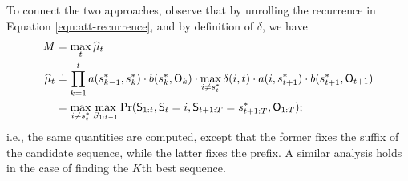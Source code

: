 To connect the two approaches, observe that by unrolling the recurrence in Equation \ref{eqn:att-recurrence}, and by definition of $\delta$, we have
\begin{align*}
	M &= \max_t \widehat{\mu}_t \\
	\widehat{\mu}_{t} &\stackrel{.}{=} \prod_{k = 1}^t a( s^*_{k-1}, s^*_{k} ) \cdot b( s^*_{k}, \mathsf{O}_{k} ) \cdot \max_{i \neq s^*_{t}} \delta(i, t) \cdot a( i, s^*_{t+1} ) \cdot b( s^*_{t+1}, \mathsf{O}_{t+1} ) \\
	&= \max_{i \neq s^*_{t}} \max_{S_{1:t-1}} {\Pr( \mathsf{S}_{1:t}, \mathsf{S}_t = i, \mathsf{S}_{t+1:T} = s^*_{t+1:T}, \mathsf{O}_{1:T} )};
\end{align*}
i.e., the same quantities are computed, except that the former fixes the suffix of the candidate sequence, while the latter fixes the prefix.
A similar analysis holds in the case of finding the $K$th best sequence.
